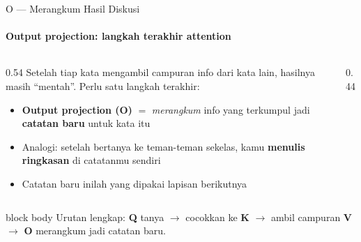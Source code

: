 \documentclass[aspectratio=169,t]{beamer}
\begin{document}
\begin{frame}{O --- Merangkum Hasil Diskusi}
  \framesubtitle{Output projection: langkah terakhir attention}
  \begin{columns}[T]
    \begin{column}{0.54\textwidth}
      \footnotesize
      Setelah tiap kata mengambil campuran info dari kata lain, hasilnya masih ``mentah''. Perlu satu langkah terakhir:
      \begin{itemize}
        \item \textcolor{nvlightgreen}{\textbf{Output projection (O)}} $=$ \emph{merangkum} info yang terkumpul jadi \textbf{catatan baru} untuk kata itu
        \item Analogi: setelah bertanya ke teman-teman sekelas, kamu \textbf{menulis ringkasan} di catatanmu sendiri
        \item Catatan baru inilah yang dipakai lapisan berikutnya
      \end{itemize}
    \end{column}
    \begin{column}{0.44\textwidth}
      \centering
    \end{column}
  \end{columns}
  \vspace{0.3em}
  \begin{beamercolorbox}[rounded=true,shadow=false,sep=4pt]{block body}
    \centering\small\color{white}
    Urutan lengkap: \textbf{Q} tanya $\to$ cocokkan ke \textbf{K} $\to$ ambil campuran \textbf{V} $\to$ \textbf{O} merangkum jadi catatan baru.
  \end{beamercolorbox}
\end{frame}
\end{document}
